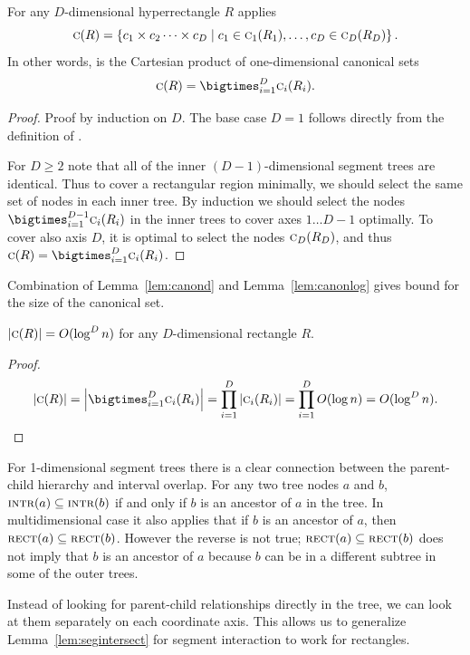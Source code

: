 \documentclass[english,gradu]{tktltiki2018}
\begin{document}
\begin{lem}\label{lem:canond}
For any $D$-dimensional hyperrectangle $R$ applies
$$\canon{R}=\set{c_1\times c_2\dots\times c_D \mid c_1\in\canoni{R_1}{1}, \dots, c_D\in\canoni{R_D}{D}}.$$
In other words,  is the Cartesian product of one-dimensional canonical sets
$$\canon{R}=\bigtimes_{i=1}^D \canoni{R_i}{i}.$$
\end{lem}
\begin{proof}
Proof by induction on $D$.
The base case $D=1$ follows directly from the definition of .

For $D\ge 2$ note that all of the inner $(D-1)$-dimensional segment trees are identical.
Thus to cover a rectangular region minimally, we should select the same set of nodes in each inner tree.
By induction we should select the nodes $\bigtimes_{i=1}^{D-1} \canoni{R_i}{i}$ in the inner trees to cover axes $1\dots D-1$ optimally.
To cover also axis $D$, it is optimal to select the nodes $\canoni{R_D}{D}$, and thus $\canon{R}=\bigtimes_{i=1}^D\canoni{R_i}{i}$.
\end{proof}

Combination of Lemma~\ref{lem:canond} and Lemma~\ref{lem:canonlog} gives bound for the size of the canonical set.

\begin{lem}$\size{\canon{R}}=O(\log^D\segsize)$ for any $D$-dimensional rectangle $R$.\end{lem}
\begin{proof}
$$
\size{\canon{R}} = \size{\bigtimes_{i=1}^D \canoni{R_i}{i}}
= \prod_{i=1}^D \size{\canoni{R_i}{i}}
= \prod_{i=1}^D O(\log\segsize)
= O(\log^D\segsize).
$$
\end{proof}

For 1-dimensional segment trees there is a clear connection between the parent-child hierarchy and interval overlap.
For any two tree nodes $a$ and $b$, $\inter{a}\subseteq\inter{b}$ if and only if $b$ is an ancestor of $a$ in the tree.
In multidimensional case it also applies that if $b$ is an ancestor of $a$, then $\rect{a}\subseteq\rect{b}$.
However the reverse is not true; $\rect{a}\subseteq\rect{b}$ does not imply that $b$ is an ancestor of $a$ because $b$ can be in a different subtree in some of the outer trees.

Instead of looking for parent-child relationships directly in the tree, we can look at them separately on each coordinate axis.
This allows us to generalize Lemma~\ref{lem:segintersect} for segment interaction to work for rectangles.
\end{document}

